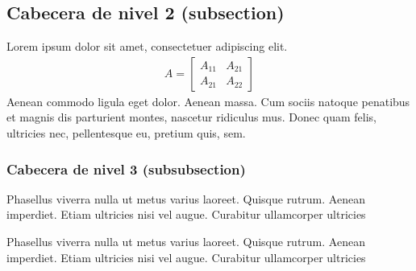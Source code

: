 \documentclass[paper=a4,fontsize=11pt]{scrartcl}
\numberwithin{equation}{section} %
\numberwithin{figure}{section}
\numberwithin{table}{section}
\begin{document}

\subsection{Cabecera de nivel 2 (subsection)}

Lorem ipsum dolor sit amet, consectetuer adipiscing elit. 
\begin{align}
A = 
\begin{bmatrix}
A_{11} & A_{21} \\
A_{21} & A_{22}
\end{bmatrix}
\end{align}
Aenean commodo ligula eget dolor. Aenean massa. Cum sociis natoque penatibus et magnis dis parturient montes, nascetur ridiculus mus. Donec quam felis, ultricies nec, pellentesque eu, pretium quis, sem.



\subsubsection{Cabecera de nivel 3 (subsubsection)}

Phasellus viverra nulla ut metus varius laoreet. Quisque rutrum. Aenean imperdiet. Etiam ultricies nisi vel augue. Curabitur ullamcorper ultricies

Phasellus viverra nulla ut metus varius laoreet. Quisque rutrum. Aenean imperdiet. Etiam ultricies nisi vel augue. Curabitur ullamcorper ultricies
\end{document}
